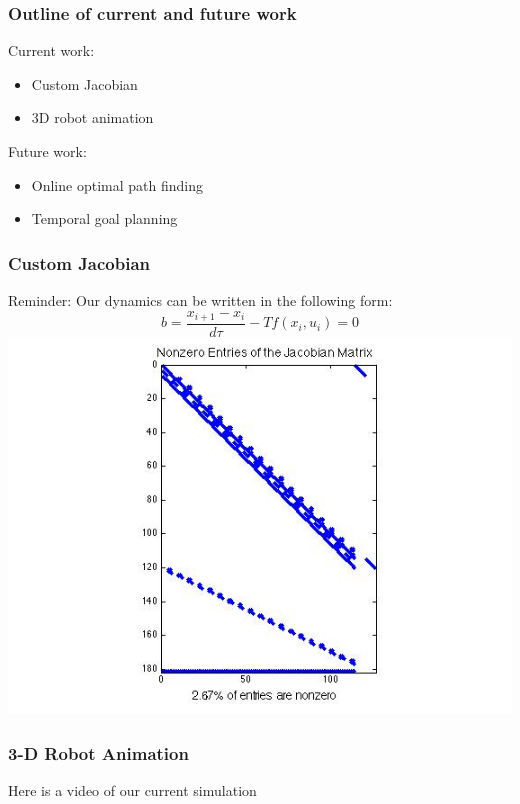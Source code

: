\documentclass{beamer}
\begin{document}
\begin{frame}
\frametitle{Outline of current and future work}
Current work:
\begin{itemize}
\item Custom Jacobian
\item 3D robot animation
\end{itemize}
Future work:
\begin{itemize}
\item Online optimal path finding
\item Temporal goal planning
\end{itemize}

\end{frame}

\begin{frame}
\frametitle{Custom Jacobian}
Reminder: Our dynamics can be written in the following form:
$$b = \frac{x_{i+1} - x_i}{d\tau} - Tf(x_i,u_i) = 0$$
\includegraphics[width=0.75\linewidth,height=0.55\textheight]{Spy_Jacobian.jpg}

\end{frame}


\begin{frame}
\frametitle{3-D Robot Animation}
Here is a video of our current simulation

\end{frame}
\end{document}
